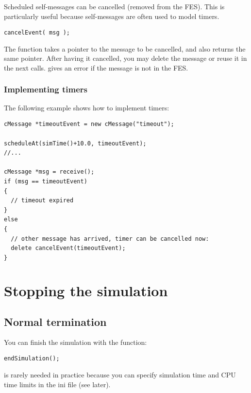 Scheduled self-messages can be cancelled
 (removed from the FES).
This is particularly useful because self-messages are often used
to model timers.

\begin{verbatim}
cancelEvent( msg );
\end{verbatim}

The  function takes a pointer to the message to
be cancelled, and also returns the same pointer. After having it
cancelled, you may delete the message or reuse it in the next
 calls.  gives an error if
the message is not in the FES.


\subsubsection{Implementing timers}

The following example shows how to implement timers:

\begin{verbatim}
cMessage *timeoutEvent = new cMessage("timeout");

scheduleAt(simTime()+10.0, timeoutEvent);
//...

cMessage *msg = receive();
if (msg == timeoutEvent)
{
  // timeout expired
}
else
{
  // other message has arrived, timer can be cancelled now:
  delete cancelEvent(timeoutEvent);
}
\end{verbatim}





\section{Stopping the simulation}

\subsection{Normal termination}

You can finish the simulation with the  function:

\begin{verbatim}
endSimulation();
\end{verbatim}

 is rarely needed in practice because you
can specify simulation time and CPU time limits
in the ini file (see later).

